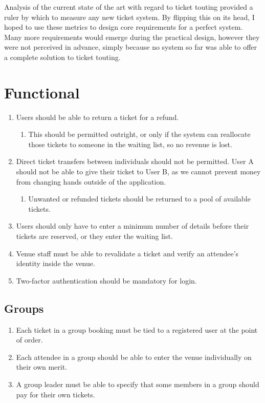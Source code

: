 \documentclass[12pt]{bhamdissertation}
\begin{document}
Analysis of the current state of the art with regard to ticket touting provided a ruler by which to measure any new ticket system. By flipping this on its head, I hoped to use these metrics to design core requirements for a perfect system. Many more requirements would emerge during the practical design, however they were not perceived in advance, simply because no system so far was able to offer a complete solution to ticket touting.

\section{Functional}

\begin{enumerate}
    \item Users should be able to return a ticket for a refund.
    \begin{enumerate}
        \item This should be permitted outright, or only if the system can reallocate those tickets to someone in the waiting list, so no revenue is lost.
    \end{enumerate}
    \item Direct ticket transfers between individuals should not be permitted. User A should not be able to give their ticket to User B, as we cannot prevent money from changing hands outside of the application.
    \begin{enumerate}
        \item Unwanted or refunded tickets should be returned to a pool of available tickets.
    \end{enumerate}
    \item Users should only have to enter a minimum number of details before their tickets are reserved, or they enter the waiting list.
    \item Venue staff must be able to revalidate a ticket and verify an attendee's identity inside the venue.
    \item Two-factor authentication should be mandatory for login.
\end{enumerate}

\subsection{Groups}

\begin{enumerate}[resume]
    \item Each ticket in a group booking must be tied to a registered user at the point of order.
    \item Each attendee in a group should be able to enter the venue individually on their own merit.
    \item A group leader must be able to specify that some members in a group should pay for their own tickets.
\end{enumerate}
\end{document}
